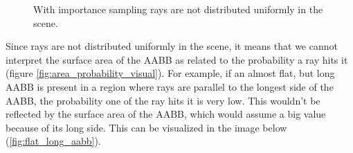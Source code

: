 \documentclass{PoliMi_MasterThesis}
\begin{document}
\begin{figure}[H]
    \centering
	\qquad
    \caption{With importance sampling rays are not distributed uniformly in the scene.}
    \label{fig:non_uniform_rays}
\end{figure}

Since rays are not distributed uniformly in the scene, it means that we cannot interpret the surface area of the AABB as related to the probability a ray hits it (figure \ref{fig:area_probability_visual}). For example, if an almost flat, but long AABB is present in a region where rays are parallel to the longest side of the AABB, the probability one of the ray hits it is very low. This wouldn't be reflected by the surface area of the AABB, which would assume a big value because of its long side. This can be visualized in the image below (\ref{fig:flat_long_aabb}).
\end{document}
